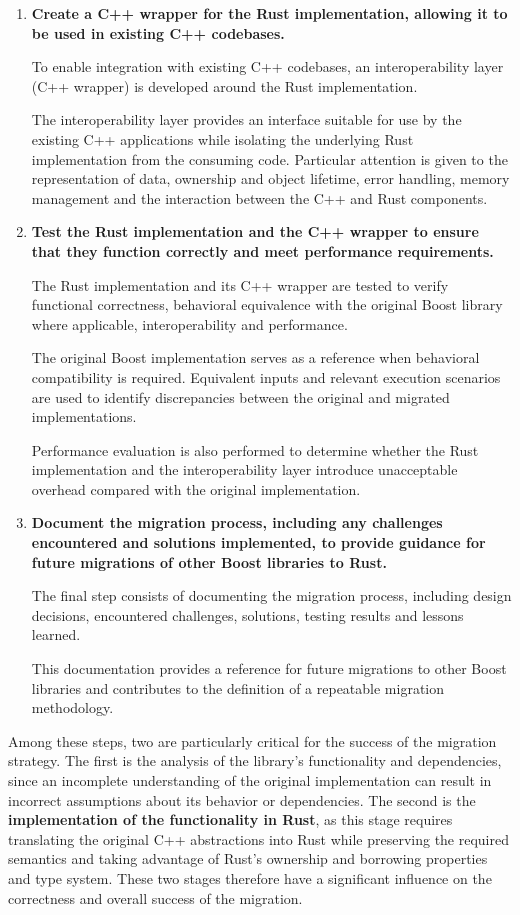 \begin{enumerate}
\item \textbf{Create a C++ wrapper for the Rust implementation, allowing it to be used in existing C++ codebases.}

To enable integration with existing C++ codebases, an interoperability layer (C++ wrapper) is developed around the Rust implementation. 

The interoperability layer provides an interface suitable for use by the existing C++ applications while isolating the 
underlying Rust implementation from the consuming code.
Particular attention is given to the representation of data, ownership and object lifetime, error handling, memory management and 
the interaction between the C++ and Rust components.

\item \textbf{Test the Rust implementation and the C++ wrapper to ensure that they function correctly 
and meet performance requirements.}

The Rust implementation and its C++ wrapper are tested to verify functional correctness, behavioral equivalence with the original
Boost library where applicable, interoperability and performance. 

The original Boost implementation serves as a reference when behavioral compatibility is required. 
Equivalent inputs and relevant execution scenarios are used to identify discrepancies between the original and migrated implementations.

Performance evaluation is also performed to determine whether the Rust implementation and the 
interoperability layer introduce unacceptable overhead compared with the original implementation.

\item \textbf{Document the migration process, including any challenges encountered and solutions implemented, 
to provide guidance for future migrations of other Boost libraries to Rust.}

The final step consists of documenting the migration process, including design decisions, encountered challenges, solutions, 
testing results and lessons learned. 

This documentation provides a reference for future migrations to other Boost libraries and 
contributes to the definition of a repeatable migration methodology.

\end{enumerate}

Among these steps, two are particularly critical for the success of the migration strategy. The first is the {analysis of 
the library's functionality and dependencies}, since an incomplete understanding of the original implementation can result in 
incorrect assumptions about its behavior or dependencies. The second is the \textbf{implementation of the functionality in Rust}, 
as this stage requires translating the original C++ abstractions into Rust while preserving the required semantics and taking 
advantage of Rust's ownership and borrowing properties and type system. These two stages therefore have a significant influence on the 
correctness and overall success of the migration.

